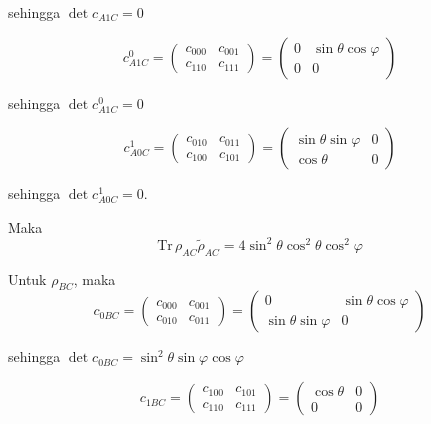 sehingga $\det c_{A1C} = 0$

\begin{equation}
	c_{A1C}^0=
	\begin{pmatrix}
		c_{000} & c_{001} \\
		c_{110} & c_{111}
	\end{pmatrix}=
	\begin{pmatrix}
		0 & \sin\theta\cos\varphi \\
		0 & 0
	\end{pmatrix}
\end{equation}

sehingga $\det c_{A1C}^0 = 0$

\begin{equation}
	c_{A0C}^1=
	\begin{pmatrix}
		c_{010} & c_{011} \\
		c_{100} & c_{101}
	\end{pmatrix}=
	\begin{pmatrix}
		\sin\theta\sin\varphi & 0 \\
		\cos\theta & 0
	\end{pmatrix}
\end{equation}

sehingga $\det c_{A0C}^1 = 0$.

Maka
\begin{equation}
	\mathrm{Tr}\,\rho_{AC}\tilde{\rho}_{AC}=4\sin^2\theta \cos^2\theta \cos^2\varphi
\end{equation}

Untuk $\rho_{BC}$, maka
\begin{equation}
	c_{0BC}=
	\begin{pmatrix}
		c_{000} & c_{001} \\
		c_{010} & c_{011}
	\end{pmatrix}=
	\begin{pmatrix}
		0 & \sin\theta\cos\varphi \\
		\sin\theta\sin\varphi & 0
	\end{pmatrix}
\end{equation}

sehingga $\det c_{0BC} = \sin^2\theta\sin\varphi\cos\varphi$

\begin{equation}
	c_{1BC}=
	\begin{pmatrix}
		c_{100} & c_{101} \\
		c_{110} & c_{111}
	\end{pmatrix}=
	\begin{pmatrix}
		\cos\theta & 0 \\
		0 & 0
	\end{pmatrix}
\end{equation}

